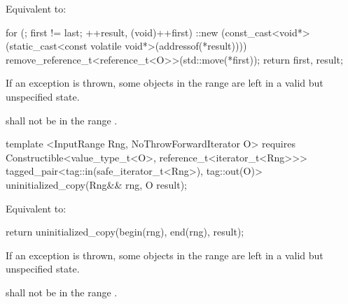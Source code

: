 {\pnum
\effects Equivalent to:
\begin{codeblock}
   for (; first != last; ++result, (void)++first) {
     ::new (const_cast<void*>(static_cast<const volatile void*>(addressof(*result))))
       remove_reference_t<reference_t<O>>(std::move(*first));
   }
   return {first, result};
\end{codeblock}

\pnum
\remarks If an exception is thrown, some objects in the range  are left in a
valid but unspecified state.

\pnum
\requires {} shall not be in the range .

\begin{codeblock}
template <InputRange Rng, NoThrowForwardIterator O>
   requires
Constructible<value_type_t<O>, reference_t<iterator_t<Rng>>>
   tagged_pair<tag::in(safe_iterator_t<Rng>), tag::out(O)>
uninitialized_copy(Rng&& rng, O result);
\end{codeblock}

\pnum
\effects Equivalent to:
\begin{codeblock}
   return uninitialized_copy(begin(rng), end(rng), result);
\end{codeblock}

\pnum
\remarks If an exception is thrown, some objects in the range  are left
in a valid but unspecified state.

\pnum
\requires {} shall not be in the range .
} %
